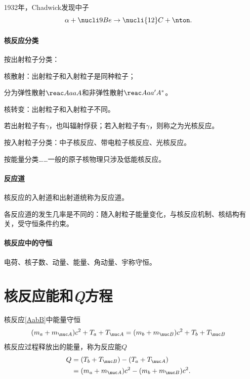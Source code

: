1932年，Chadwick发现中子
\[
	\alpha+\nucli9{Be}\to\nucli{12}C+\nton.
\]
\paragraph{核反应分类}
按出射粒子分类：
\begin{compactitem}
	\item 核散射：出射粒子和入射粒子是同种粒子；
	
	分为弹性散射$\reac AaaA$和非弹性散射$\reac Aa{a'}{A^\ast}$。
	\item 核转变：出射粒子和入射粒子不同。
	
	若出射粒子有$\gamma$，也叫辐射俘获；若入射粒子有$\gamma$，则称之为光核反应。
\end{compactitem}
按入射粒子分类：中子核反应、带电粒子核反应、光核反应。

按能量分类……一般的原子核物理只涉及低能核反应。
\paragraph{反应道}核反应的入射道和出射道统称为反应道。

各反应道的发生几率是不同的：随入射粒子能量变化，与核反应机制、核结构有关，受守恒条件约束。

\paragraph{核反应中的守恒}电荷、核子数、动量、能量、角动量、宇称守恒。
\section{核反应能和\textit{Q}方程}
核反应\eqref{AabB}中能量守恒
\[
	(m_a+m_{\nuc A})c^2+T_a+T_{\nuc A}=(m_b+m_{\nuc B})c^2+T_b+T_{\nuc B}
\]
核反应过程释放出的能量，称为反应能$Q$
\begin{align}\notag
	Q&=(T_b+T_{\nuc B})-(T_a+T_{\nuc A})\\
	&=(m_a+m_{\nuc A})c^2-(m_b+m_{\nuc B})c^2.
\end{align}
